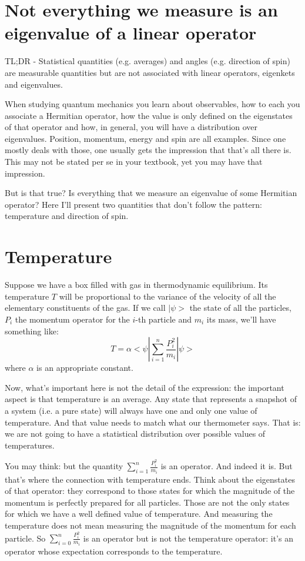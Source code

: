 \documentclass[aps,pra,10pt,floatfix,nofootinbib]{revtex4-1}
\theoremstyle{definition}
\begin{document}
\section{Not everything we measure is an eigenvalue of a linear operator}

TL;DR - Statistical quantities (e.g. averages) and angles (e.g. direction of spin) are measurable quantities but are not associated with linear operators, eigenkets and eigenvalues.

When studying quantum mechanics you learn about observables, how to each you associate a Hermitian operator, how the value is only defined on the eigenstates of that operator and how, in general, you will have a distribution over eigenvalues. Position, momentum, energy and spin are all examples. Since one mostly deals with those, one usually gets the impression that that's all there is. This may not be stated per se in your textbook, yet you may have that impression.

But is that true? Is everything that we measure an eigenvalue of some Hermitian operator? Here I'll present two quantities that don't follow the pattern: temperature and direction of spin.

\section{Temperature}

Suppose we have a box filled with gas in thermodynamic equilibrium. Its temperature $T$ will be proportional to the variance of the velocity of all the elementary constituents of the gas. If we call $|\psi>$ the state of all the particles, $P_i$ the momentum operator for the $i$-th particle and $m_i$ its mass, we'll have something like:
\begin{equation}
T=\alpha<\psi|\sum_{i=1}^{n} \frac{P_i^2}{m_i}|\psi>
\end{equation}
where $\alpha$ is an appropriate constant.

Now, what's important here is not the detail of the expression: the important aspect is that temperature is an average. Any state that represents a snapshot of a system (i.e. a pure state) will always have one and only one value of temperature. And that value needs to match what our thermometer says. That is: we are not going to have a statistical distribution over possible values of temperatures.

You may think: but the quantity $\sum_{i=1}^{n} \frac{P_i^2}{m_i}$ is an operator. And indeed it is. But that's where the connection with temperature ends. Think about the eigenstates of that operator: they correspond to those states for which the magnitude of the momentum is perfectly prepared for all particles. Those are not the only states for which we have a well defined value of temperature. And measuring the temperature does not mean measuring the magnitude of the momentum for each particle. So $\sum_{i=0}^{n} \frac{P_i^2}{m_i}$ is an operator but is not the temperature operator: it's an operator whose expectation corresponds to the temperature.
\end{document}
